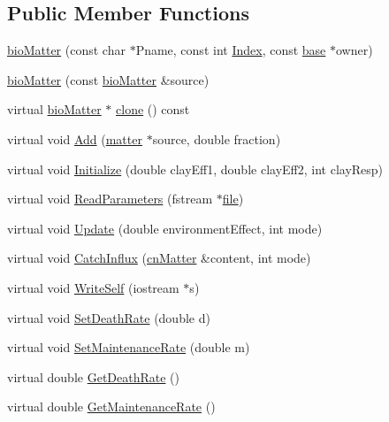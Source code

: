 \subsection*{Public Member Functions}
\begin{DoxyCompactItemize}
\item 
\hyperlink{classbio_matter_ae91ef4deaba37a7927d114ec83bc4114}{bioMatter} (const char $\ast$Pname, const int \hyperlink{classbase_afa59aaa1a0201700640234eb13a03aae}{Index}, const \hyperlink{classbase}{base} $\ast$owner)
\item 
\hyperlink{classbio_matter_ac40fd3ea8d47fe6865b7b3b0c73cae1a}{bioMatter} (const \hyperlink{classbio_matter}{bioMatter} \&source)
\item 
virtual \hyperlink{classbio_matter}{bioMatter} $\ast$ \hyperlink{classbio_matter_ab60f7bac01ff6e5de8c0be13d28c91b5}{clone} () const 
\item 
virtual void \hyperlink{classbio_matter_ab203ee03cdbc31a5e462cd8b486636bd}{Add} (\hyperlink{classmatter}{matter} $\ast$source, double fraction)
\item 
virtual void \hyperlink{classbio_matter_a6d9aa5ce1a57e75f81c034f98bef428a}{Initialize} (double clayEff1, double clayEff2, int clayResp)
\item 
virtual void \hyperlink{classbio_matter_aa792422d773ba544fe0e70ea8d5b061e}{ReadParameters} (fstream $\ast$\hyperlink{classbase_a3af52ee9891719d09b8b19b42450b6f6}{file})
\item 
virtual void \hyperlink{classbio_matter_a8ed040ad0f1ef141ae9e5507f33c924a}{Update} (double environmentEffect, int mode)
\item 
virtual void \hyperlink{classbio_matter_a5b83f540f697e51fcb235d252493675d}{CatchInflux} (\hyperlink{classcn_matter}{cnMatter} \&content, int mode)
\item 
virtual void \hyperlink{classbio_matter_aa8e3723aef3ce483763e621543d4104c}{WriteSelf} (iostream $\ast$s)
\item 
virtual void \hyperlink{classbio_matter_a506d0acd5dfdf32d7742b90961c1cf6d}{SetDeathRate} (double d)
\item 
virtual void \hyperlink{classbio_matter_adfb5f616faed3698fa71b8a29b091014}{SetMaintenanceRate} (double m)
\item 
virtual double \hyperlink{classbio_matter_a78a7ead491fa0a5b799e672309dfca3e}{GetDeathRate} ()
\item 
virtual double \hyperlink{classbio_matter_af20366c312adfce4ae986a512043cfe7}{GetMaintenanceRate} ()
\item 

\end{DoxyCompactItemize}
